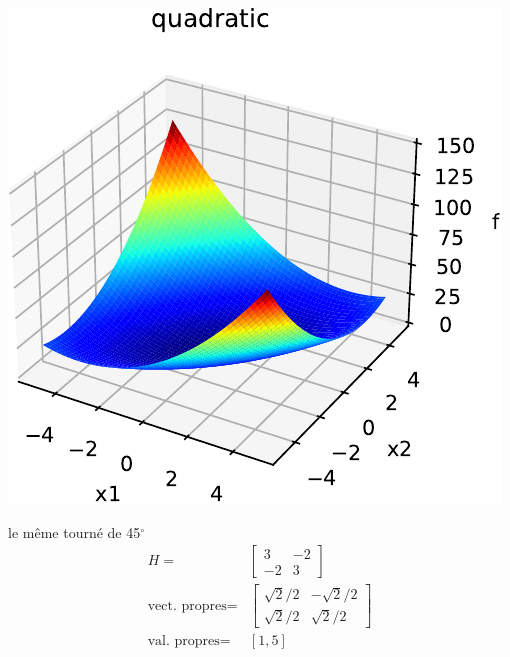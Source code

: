 \documentclass[12pt]{beamer}
\begin{document}
\begin{frame}
\begin{itemize}
\begin{frame}[allowframebreaks]
\begin{minipage}{0.5\textwidth}
\includegraphics[width=\textwidth]{quad_rot45_cond5_H_3_m2_m2_3-crop.pdf}
\end{minipage}
\begin{minipage}{0.4\textwidth}
le même tourné de 45$^\circ$
\begin{align*}
H =& \begin{bmatrix} 3 & -2 \\ -2 & 3\end{bmatrix}  \\
\text{vect. propres} =& \begin{bmatrix} \sqrt{2}/2 & -\sqrt{2}/2 \\  \sqrt{2}/2 & \sqrt{2}/2 \end{bmatrix}\\
\text{val. propres} = & [1, 5]
\end{align*}
\end{minipage}
\newpage
\begin{minipage}{0.5\textwidth}

\end{minipage}
\end{frame}
\end{itemize}
\end{frame}
\end{document}
